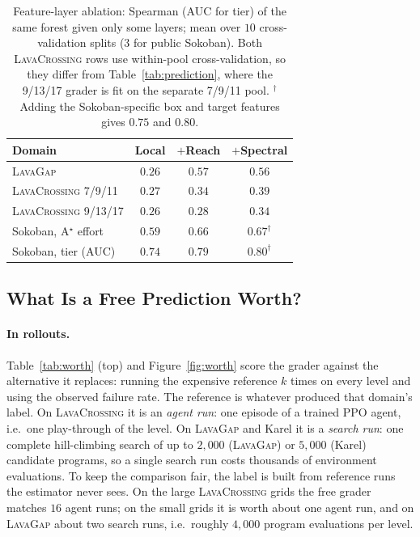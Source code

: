 \documentclass[twoside]{article}
\begin{document}
\begin{table}[t]
\centering
\small
\caption{Feature-layer ablation: Spearman (AUC for tier) of the same forest given only some layers; mean over $10$ cross-validation splits ($3$ for public Sokoban). Both \textsc{LavaCrossing} rows use within-pool cross-validation, so they differ from Table~\ref{tab:prediction}, where the 9/13/17 grader is fit on the separate 7/9/11 pool. $^\dagger$Adding the Sokoban-specific box and target features gives $0.75$ and $0.80$.}
\label{tab:ablation}
\setlength{\tabcolsep}{3pt}
\begin{tabular}{lccc}
\toprule
Domain & Local & $+$Reach & $+$Spectral \\
\midrule
\textsc{LavaGap} & $0.26$ & $\mathbf{0.57}$ & $0.56$ \\
\textsc{LavaCrossing} 7/9/11 & $0.27$ & $0.34$ & $\mathbf{0.39}$ \\
\textsc{LavaCrossing} 9/13/17 & $0.26$ & $0.28$ & $\mathbf{0.34}$ \\
Sokoban, A$^\star$ effort & $0.59$ & $0.66$ & $\mathbf{0.67}^\dagger$ \\
Sokoban, tier (AUC) & $0.74$ & $0.79$ & $\mathbf{0.80}^\dagger$ \\
\bottomrule
\end{tabular}
\end{table}

\subsection{What Is a Free Prediction Worth?}
\label{sec:results-worth}

\paragraph{In rollouts.} Table~\ref{tab:worth} (top) and Figure~\ref{fig:worth} score the grader against the alternative it replaces: running the expensive reference $k$ times on every level and using the observed failure rate. The reference is whatever produced that domain's label. On \textsc{LavaCrossing} it is an \emph{agent run}: one episode of a trained PPO agent, i.e.\ one play-through of the level. On \textsc{LavaGap} and Karel it is a \emph{search run}: one complete hill-climbing search of up to $2{,}000$ (\textsc{LavaGap}) or $5{,}000$ (Karel) candidate programs, so a single search run costs thousands of environment evaluations. To keep the comparison fair, the label is built from reference runs the estimator never sees. On the large \textsc{LavaCrossing} grids the free grader matches $16$ agent runs; on the small grids it is worth about one agent run, and on \textsc{LavaGap} about two search runs, i.e.\ roughly $4{,}000$ program evaluations per level.
\end{document}

